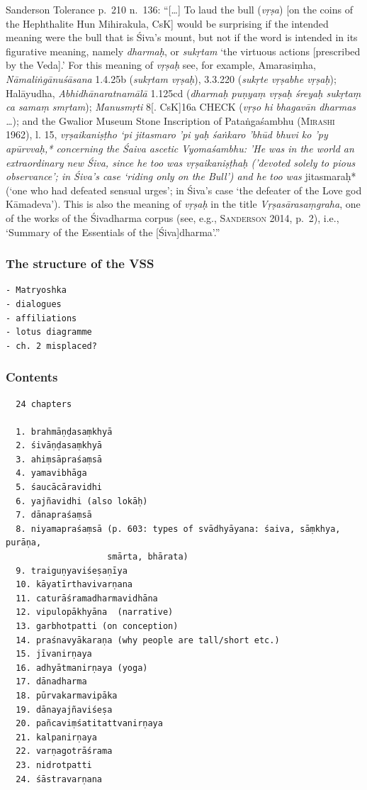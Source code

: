 \documentclass[12pt]{book}
\begin{document}
Sanderson Tolerance p.~210 n.~136: ``{[}\ldots{}{]} To laud the bull
(\emph{vṛṣa}) {[}on the coins of the Hephthalite Hun Mihirakula, CsK{]}
would be surprising if the intended meaning were the bull that is Śiva's
mount, but not if the word is intended in its figurative meaning, namely
\emph{dharmaḥ}, or \emph{sukṛtam} `the virtuous actions {[}prescribed by
the Veda{]}.' For this meaning of \emph{vṛṣaḥ} see, for example,
Amarasiṃha, \emph{Nāmaliṅgānuśāsana} 1.4.25b (\emph{sukṛtam vṛṣaḥ}),
3.3.220 (\emph{sukṛte vṛṣabhe vṛṣaḥ}); Halāyudha,
\emph{Abhidhānaratnamālā} 1.125cd (\emph{dharmaḥ puṇyaṃ vṛṣaḥ śreyaḥ
sukṛtaṃ ca samaṃ smṛtam}); \emph{Manusmṛti} 8{[}. CsK{]}16a CHECK
(\emph{vṛṣo hi bhagavān dharmas \ldots{}}); and the Gwalior Museum Stone
Inscription of Pataṅgaśambhu (\textsc{Mirashi} 1962), l. 15,
\emph{vṛṣaikaniṣṭho `pi jitasmaro 'pi yaḥ śaṅkaro 'bhūd bhuvi ko 'py
apūrvvaḥ,* concerning the Śaiva ascetic Vyomaśambhu: 'He was in the
world an extraordinary new Śiva, since he too was \emph{vṛṣaikaniṣṭhaḥ}
('devoted solely to pious observance'; in Śiva's case `riding only on
the Bull') and he too was }jitasmaraḥ* (`one who had defeated sensual
urges'; in Śiva's case `the defeater of the Love god Kāmadeva'). This is
also the meaning of \emph{vṛṣaḥ} in the title \emph{Vṛṣasārasaṃgraha},
one of the works of the Śivadharma corpus (see, e.g., \textsc{Sanderson}
2014, p.~2), i.e., `Summary of the Essentials of the
{[}Śiva{]}dharma'.''

{%
\subsubsection{The structure of the
VSS}\label{the-structure-of-the-vss}}

\begin{verbatim}
- Matryoshka 
- dialogues
- affiliations
- lotus diagramme
- ch. 2 misplaced? 
\end{verbatim}

{%
\subsubsection{Contents}\label{contents}}

\begin{verbatim}
  24 chapters

  1. brahmāṇḍasaṃkhyā 
  2. śivāṇḍasaṃkhyā 
  3. ahiṃsāpraśaṃsā 
  4. yamavibhāga
  5. śaucācāravidhi
  6. yajñavidhi (also lokāḥ)
  7. dānapraśaṃsā 
  8. niyamapraśaṃsā (p. 603: types of svādhyāyana: śaiva, sāṃkhya, purāṇa,
                    smārta, bhārata)
  9. traiguṇyaviśeṣaṇīya
  10. kāyatīrthavivarṇana
  11. caturāśramadharmavidhāna 
  12. vipulopākhyāna  (narrative)
  13. garbhotpatti (on conception)
  14. praśnavyākaraṇa (why people are tall/short etc.)
  15. jīvanirṇaya 
  16. adhyātmanirṇaya (yoga) 
  17. dānadharma
  18. pūrvakarmavipāka
  19. dānayajñaviśeṣa
  20. pañcaviṃśatitattvanirṇaya
  21. kalpanirṇaya
  22. varṇagotrāśrama
  23. nidrotpatti
  24. śāstravarṇana
\end{verbatim}
\end{document}
